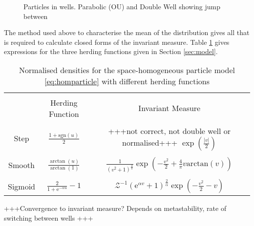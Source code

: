         \begin{figure}
            \centering
            \caption{Particles in wells. Parabolic (OU) and Double Well showing jump between}
            \label{fig:particlewells}
        \end{figure}
        
        The method used above to characterise the mean of the distribution gives all that is required to calculate closed forms of the invariant measure. Table \ref{tab:spaceparticleinv} gives expressions for the three herding functions given in Section \ref{sec:model}.
        \begin{table}
        \centering
        \begin{tabular}{|c|c|c|}
            \hline 
            & & \\[-0.5em] 
            & Herding Function & Invariant Measure \\[10pt]
            \hline
            & & \\[-0.5em] 
            Step & $\frac{1+\mathrm{sgn}(u)}{2}$ & +++not correct, not double well or normalised+++ $\exp\left(\frac{|v|}{2}\right)$ \\[10pt]
            \hline 
            & & \\[-0.5em]
            Smooth &$\frac{\arctan(u)}{\arctan(1)}$  & $\frac{1}{(v^2+1)^{\frac{2}{\pi}}} \exp\left( -\frac{v^2}{2}+\frac{4}{\pi}v\mathrm{arctan}(v)\right)$ \\[10pt]
            \hline 
            & & \\[-0.5em]
            Sigmoid & $\frac{2}{1+\mathrm{e}^{-\alpha u}} - 1$ & $ \mathcal{Z}^{-1}(\mathrm{e}^{\alpha v}+1)^{\frac{2}{\alpha}}\exp\left(-\frac{v^2}{2} - v\right)$ \\[10pt]
            \hline 
        \end{tabular}
        \caption[Space-Homogeneous Particle Densities]{Normalised densities for the space-homogeneous particle model \eqref{eq:homparticle} with different herding functions}
        \label{tab:spaceparticleinv}
        \end{table}
    
        +++Convergence to invariant measure? Depends on metastability, rate of switching between wells +++
     
